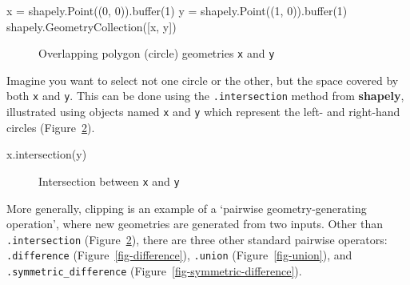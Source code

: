 \documentclass[
  letterpaper,
]{krantz}
\newenvironment{Shaded}{\begin{snugshade}}{\end{snugshade}}
\newcommand{\BuiltInTok}[1]{\textcolor[rgb]{0.00,0.23,0.31}{#1}}
\newcommand{\DecValTok}[1]{\textcolor[rgb]{0.68,0.00,0.00}{#1}}
\newcommand{\NormalTok}[1]{\textcolor[rgb]{0.00,0.23,0.31}{#1}}
\newcommand{\OperatorTok}[1]{\textcolor[rgb]{0.37,0.37,0.37}{#1}}
\begin{document}
\begin{Shaded}
\begin{Highlighting}[]
\NormalTok{x }\OperatorTok{=}\NormalTok{ shapely.Point((}\DecValTok{0}\NormalTok{, }\DecValTok{0}\NormalTok{)).}\BuiltInTok{buffer}\NormalTok{(}\DecValTok{1}\NormalTok{)}
\NormalTok{y }\OperatorTok{=}\NormalTok{ shapely.Point((}\DecValTok{1}\NormalTok{, }\DecValTok{0}\NormalTok{)).}\BuiltInTok{buffer}\NormalTok{(}\DecValTok{1}\NormalTok{)}
\NormalTok{shapely.GeometryCollection([x, y])}
\end{Highlighting}
\end{Shaded}

\begin{figure}[H]


\caption{\label{fig-overlapping-circles}Overlapping polygon (circle)
geometries \texttt{x} and \texttt{y}}

\end{figure}%

Imagine you want to select not one circle or the other, but the space
covered by both \texttt{x} and \texttt{y}. This can be done using the
\texttt{.intersection} method from \textbf{shapely}, illustrated using
objects named \texttt{x} and \texttt{y} which represent the left- and
right-hand circles (Figure~\ref{fig-intersection}).

\begin{Shaded}
\begin{Highlighting}[]
\NormalTok{x.intersection(y)}
\end{Highlighting}
\end{Shaded}

\begin{figure}[H]


\caption{\label{fig-intersection}Intersection between \texttt{x} and
\texttt{y}}

\end{figure}%

More generally, clipping is an example of a `pairwise
geometry-generating operation', where new geometries are generated from
two inputs. Other than \texttt{.intersection}
(Figure~\ref{fig-intersection}), there are three other standard pairwise
operators: \texttt{.difference} (Figure~\ref{fig-difference}),
\texttt{.union} (Figure~\ref{fig-union}), and
\texttt{.symmetric\_difference} (Figure~\ref{fig-symmetric-difference}).
\end{document}
